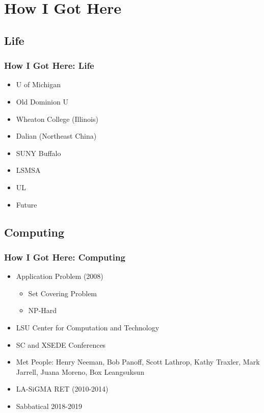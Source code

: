 \section{How I Got Here}

\subsection{Life}
\begin{frame}[t]
	\frametitle{How I Got Here:  Life}
\Large

\begin{itemize}
	\item U of Michigan
	\item Old Dominion U 
	\item Wheaton College (Illinois)
	\item Dalian (Northeast China)
	\item SUNY Buffalo
	\item LSMSA
	\item UL
	\item Future
\end{itemize}

\end{frame}

\subsection{Computing}
\begin{frame}[t]
	\frametitle{How I Got Here:  Computing}
\Large

	\begin{itemize}
		\item Application Problem (2008)
		\begin{itemize}
			\item Set Covering Problem
			\item NP-Hard
		\end{itemize}
		\item LSU Center for Computation and Technology
		\item SC and XSEDE Conferences
		\item Met People:  Henry Neeman, Bob Panoff, Scott Lathrop, Kathy Traxler, Mark Jarrell, Juana Moreno, Box Leangsuksun
		\item LA-SiGMA RET (2010-2014)
		\item Sabbatical 2018-2019
	\end{itemize}

\end{frame}

